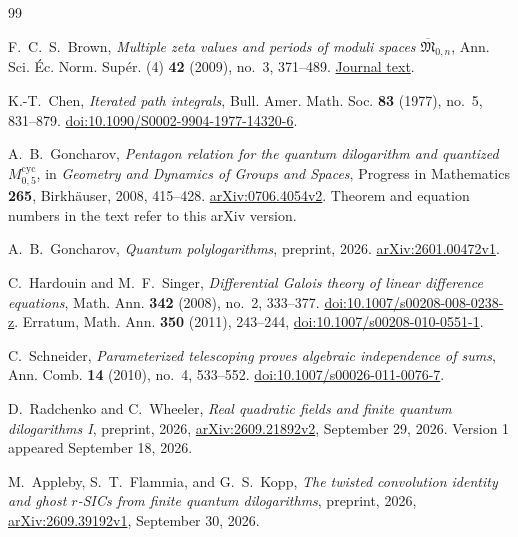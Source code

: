 \documentclass[11pt]{article}
\numberwithin{equation}{section}
\theoremstyle{definition}
\theoremstyle{remark}
\begin{document}
\begin{thebibliography}{99}

F.~C.~S.~Brown,
\emph{Multiple zeta values and periods of moduli spaces
$\overline{\mathfrak M}_{0,n}$},
Ann. Sci. \'Ec. Norm. Sup\'er. (4) \textbf{42} (2009), no.~3, 371--489.
\href{https://www.numdam.org/item/ASENS_2009_4_42_3_371_0/}{Journal text}.

K.-T.~Chen,
\emph{Iterated path integrals},
Bull. Amer. Math. Soc. \textbf{83} (1977), no.~5, 831--879.
\href{https://doi.org/10.1090/S0002-9904-1977-14320-6}{doi:10.1090/S0002-9904-1977-14320-6}.

A.~B.~Goncharov,
\emph{Pentagon relation for the quantum dilogarithm and quantized
$M^{\mathrm{cyc}}_{0,5}$},
in \emph{Geometry and Dynamics of Groups and Spaces},
Progress in Mathematics \textbf{265}, Birkh\"auser, 2008, 415--428.
\href{https://arxiv.org/abs/0706.4054v2}{arXiv:0706.4054v2}.
Theorem and equation numbers in the text refer to this arXiv version.

A.~B.~Goncharov,
\emph{Quantum polylogarithms},
preprint, 2026.
\href{https://arxiv.org/abs/2601.00472v1}{arXiv:2601.00472v1}.

C.~Hardouin and M.~F.~Singer,
\emph{Differential Galois theory of linear difference equations},
Math. Ann. \textbf{342} (2008), no.~2, 333--377.
\href{https://doi.org/10.1007/s00208-008-0238-z}{doi:10.1007/s00208-008-0238-z}.
Erratum, Math. Ann. \textbf{350} (2011), 243--244,
\href{https://doi.org/10.1007/s00208-010-0551-1}{doi:10.1007/s00208-010-0551-1}.

C.~Schneider,
\emph{Parameterized telescoping proves algebraic independence of sums},
Ann. Comb. \textbf{14} (2010), no.~4, 533--552.
\href{https://doi.org/10.1007/s00026-011-0076-7}{doi:10.1007/s00026-011-0076-7}.

D.~Radchenko and C.~Wheeler,
\emph{Real quadratic fields and finite quantum dilogarithms I},
preprint, 2026, \href{https://arxiv.org/abs/2609.21892v2}{arXiv:2609.21892v2},
September 29, 2026. Version 1 appeared September 18, 2026.

M.~Appleby, S.~T.~Flammia, and G.~S.~Kopp,
\emph{The twisted convolution identity and ghost $r$-SICs from finite quantum dilogarithms},
preprint, 2026, \href{https://arxiv.org/abs/2609.39192v1}{arXiv:2609.39192v1},
September 30, 2026.



\end{thebibliography}
\end{document}
